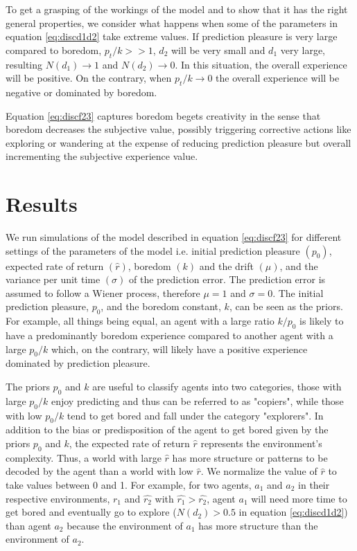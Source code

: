 \documentclass[11pt, onecolumn]{article}
\begin{document}
To get a grasping of the workings of the model and to show that it has the right general properties, we consider what happens when some of the parameters in  equation \ref{eq:discd1d2} take extreme values. If prediction pleasure is very large compared to boredom, $p_t/k >> 1$, $d_2$ will be very small and $d_1$ very large, resulting $N(d_1) \to 1$ and $N(d_2) \to 0$. In this situation, the overall experience will be positive. On the contrary, when $p_t/k \to 0$ the overall experience  will be negative or dominated by boredom. 

Equation \ref{eq:discf23} captures boredom begets creativity in the sense that boredom decreases the subjective value, possibly triggering corrective actions like exploring or wandering at the expense of reducing prediction pleasure but overall incrementing the subjective experience value.

\section{Results}
\label{se:re}

We run simulations of the model described in equation \ref{eq:discf23} for different settings of the parameters of the model i.e. initial prediction pleasure $(p_0)$, expected rate of return $(\hat{r})$, boredom $(k)$ and the drift $(\mu)$, and the variance per unit time $(\sigma)$ of the prediction error. The prediction error is assumed to follow a Wiener process, therefore $\mu = 1$ and $\sigma = 0$. 
The initial prediction pleasure, $p_0$, and the boredom constant, $k$, can be seen as the priors. For example, all things being equal, an agent with a large ratio $k/p_0$ is likely to have a predominantly boredom experience compared to another agent with a large $p_0/k$ which, on the contrary, will likely have a positive experience dominated by prediction pleasure. 

The priors $p_0$ and $k$ are useful to classify agents into two categories, those with large $p_0/k$ enjoy predicting and thus can be referred to as "copiers", while those with low $p_0/k$ tend to get bored and fall under the category "explorers". 
In addition to the bias or predisposition of the agent to get bored given by the priors $p_0$ and $k$, the expected rate of return $\hat{r}$ represents the environment's complexity. Thus, a world with large $\hat{r}$ has more structure or patterns to be decoded by the agent than a world with low $\hat{r}$. We normalize the value of $\hat{r}$ to take values between 0 and 1.
For example, for two agents, $a_1$ and $a_2$ in their respective environments, $\hat{r_1}$ and $\hat{r_2}$ with $\hat{r_1} > \hat{r_2}$, agent $a_1$ will need more time to get bored and eventually go to explore ($N(d_2) > 0.5$ in equation \ref{eq:discd1d2}) than agent $a_2$ because the environment of $a_1$ has more structure than the environment of $a_2$.
\end{document}
